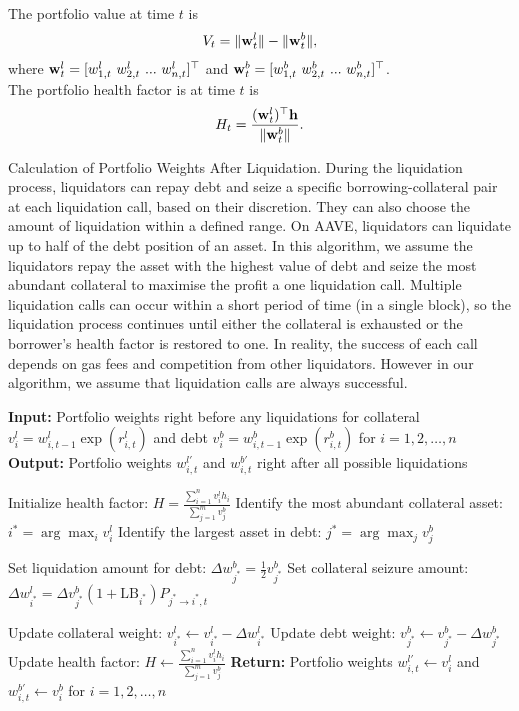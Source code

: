 \documentclass{article} %
\theoremstyle{plain}
\theoremstyle{definition} %
\begin{document}
The portfolio value at time $t$ is
\begin{align*}
  V_t = \|{\bf w}^l_t\| - \|{\bf w}^b_t\|,
  \end{align*}
  where ${\bf w}^l_t =[w^{l}_{1,t}\ w^{l}_{2,t}\ ...\ w^{l}_{n,t}]^\top$ and ${\bf w}^b_t=[w^{b}_{1,t}\ w^{b}_{2,t}\ ...\ w^{b}_{n,t}]^\top$.\\

The portfolio health factor is at time $t$ is 
\begin{align*}
H_t = \frac{({\bf w}^l_t)^\top {\bf h} }{\|{\bf w}^b_t\|}.
\end{align*}

\begin{algorithm}[t]
  \caption{Calculation of Portfolio Weights After Liquidation. 
  During the liquidation process, 
  liquidators can repay debt and seize a specific borrowing-collateral pair at each liquidation call, based on their discretion. 
  They can also choose the amount of liquidation within a defined range. 
  On AAVE, liquidators can liquidate up to half of the debt position of an asset.
  In this algorithm, we assume the liquidators repay the asset with the highest value of debt and seize the most abundant collateral to maximise the profit a one liquidation call.
  Multiple liquidation calls can occur within a short period of time (in a single block), so 
  the liquidation process continues until either the collateral is exhausted or the borrower's health factor is restored to one.
  In reality, the success of each call depends on gas fees and competition from other liquidators. 
  However in our algorithm, we assume that liquidation calls are always successful. }
  \label{alg:liquidation_weights}
  \begin{algorithmic}[1]
  \STATE \textbf{Input:} Portfolio weights right before any liquidations for collateral $v^l_i=w^l_{i,t-1}\exp(r^l_{i, t})$ and debt $v^b_i=w^b_{i,t-1}\exp(r^b_{i, t})$ for $i=1,2,\dots,n$
  \STATE \textbf{Output:} Portfolio weights $w^{l'}_{i,t}$ and $w^{b'}_{i,t}$ right after all possible liquidations
  
  \STATE Initialize health factor: $H = \frac{\sum_{i=1}^{n} v^l_ih_i}{\sum_{j=1}^{m} v^b_j}$
      \STATE Identify the most abundant collateral asset: $i^* = \arg\max_i v^l_i$
      \STATE Identify the largest asset in debt: $j^* = \arg\max_j v^b_j$

      \STATE Set liquidation amount for debt: $\Delta w^b_{j^*} = \frac{1}{2} v^b_{j^*}$
      \STATE Set collateral seizure amount: $\Delta w^l_{i^*} = \Delta v^b_{j^*} (1 + \text{LB}_{i^*})P_{j^* \rightarrow i^*, t}$
      
      \STATE Update collateral weight: $v^{l}_{i^*} \leftarrow v^l_{i^*} - \Delta w^l_{i^*}$
      \STATE Update debt weight: $v^{b}_{j^*} \leftarrow v^b_{j^*} - \Delta w^b_{j^*}$
      \STATE Update health factor: $H \leftarrow \frac{\sum_{i=1}^{n} v^{l}_i h_i}{\sum_{j=1}^{m} v^{b}_j}$
  \ENDWHILE
  \STATE \textbf{Return:} Portfolio weights $w^{l'}_{i,t}\leftarrow v^{l}_i$ and $w^{b'}_{i,t}\leftarrow v^{b}_i$ for $i=1,2,\dots,n$
  \end{algorithmic}
  \end{algorithm}
\end{document}
